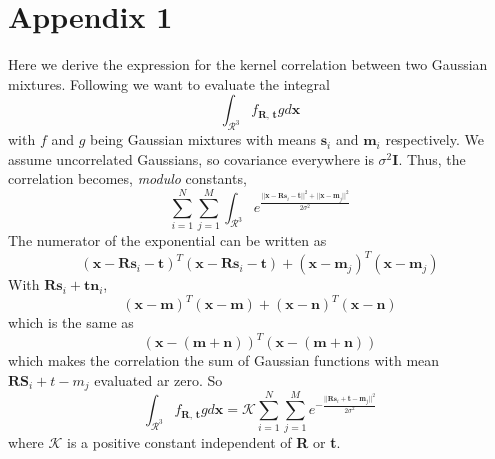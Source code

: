 \documentclass[11pt, a4paper]{article}
\begin{document}
\section*{Appendix 1}
Here we derive the expression for the kernel correlation between two Gaussian mixtures. Following \cite{main} we want to evaluate the integral $$\int_{\mathcal{R}^3} f_{\textbf{R, t}} g d\textbf{x}$$ with $f$ and $g$ being Gaussian mixtures with means $\textbf{s}_i$ and $\textbf{m}_i$ respectively. We assume uncorrelated Gaussians, so covariance everywhere is $\sigma^2 \textbf{I}$. Thus, the correlation becomes, \textit{modulo} constants, $$\sum_{i=1}^{N} \sum_{j=1}^{M} \int_{\mathcal{R}^3} e^{\frac{|| \textbf{x} - \textbf{Rs}_i - \textbf{t} ||^2 + || \textbf{x} - \textbf{m}_j ||^2}{2 \sigma^2}}$$ The numerator of the exponential can be written as $$\left( \textbf{x} - \textbf{Rs}_i - \textbf{t} \right)^T \left( \textbf{x} - \textbf{Rs}_i - \textbf{t} \right) + \left( \textbf{x} - \textbf{m}_j \right)^T \left( \textbf{x} - \textbf{m}_j \right)$$ With $\textbf{Rs}_i + \textbf{t} \textbf{n}_i$,
$$\left( \textbf{x} - \textbf{m} \right)^T \left( \textbf{x} - \textbf{m} \right) + \left( \textbf{x} - \textbf{n} \right)^T \left( \textbf{x} - \textbf{n} \right)$$ which is the same as $$\left( \textbf{x} - (\textbf{m}+\textbf{n}) \right)^T \left( \textbf{x} - (\textbf{m}+\textbf{n}) \right)$$ which makes the correlation the sum of Gaussian functions with mean $\textbf{RS}_i + t - m_j$ evaluated ar zero. So $$\int_{\mathcal{R}^3} f_{\textbf{R, t}} g d\textbf{x} = \mathcal{K} \sum_{i=1}^{N} \sum_{j=1}^{M} e^{-\frac{|| \textbf{Rs}_i + \textbf{t} - \textbf{m}_j ||^2}{2 \sigma^2}}$$ where $\mathcal{K}$ is a positive constant independent of \textbf{R} or \textbf{t}.
\end{document}
